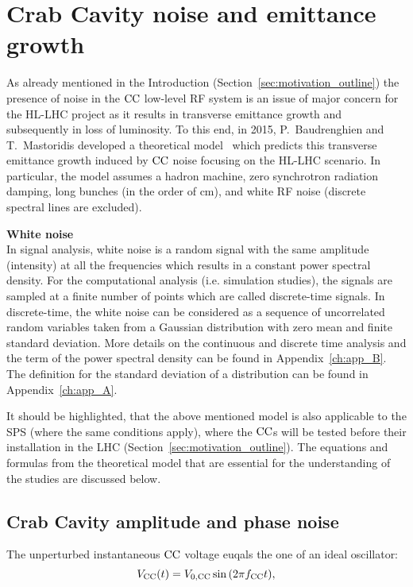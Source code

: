 \section{Crab Cavity noise and emittance growth}\label{eq:CC_noise_intro}
As already mentioned in the Introduction (Section~\ref{sec:motivation_outline}) the presence of noise in the ${\mathrm{CC}}$ low-level RF system is an issue of major concern for the HL-LHC project as it results in transverse emittance growth and subsequently in loss of luminosity. To this end, in 2015, P.~Baudrenghien and T.~Mastoridis developed a theoretical model~\cite{PhysRevSTAB.18.101001} which predicts this transverse emittance growth induced by ${\mathrm{CC}}$ noise focusing on the HL-LHC scenario. In particular, the model assumes a hadron machine, zero synchrotron radiation damping, long bunches (in the order of cm), and white RF noise (discrete spectral lines are excluded).  

\textbf{White noise}\\
In signal analysis, white noise is a random signal with the same amplitude (intensity) at all the frequencies which results in a constant power spectral density. For the computational analysis (i.e. simulation studies), the signals are sampled at a finite number of points which are called discrete-time signals. In discrete-time, the white noise can be considered as a sequence of uncorrelated random variables taken from a Gaussian distribution with zero mean and finite standard deviation. More details on the continuous and discrete time analysis and the term of the power spectral density can be found in Appendix~\ref{ch:app_B}. The definition for the standard deviation of a distribution can be found in Appendix~\ref{ch:app_A}.

It should be highlighted, that the above mentioned model is also applicable to the SPS (where the same conditions apply), where the ${\mathrm{CC}}$s will be tested before their installation in the LHC (Section~\ref{sec:motivation_outline}). %
The equations and formulas from the theoretical model that are essential for the understanding of the studies are discussed below.


\subsection{Crab Cavity amplitude and phase noise}\label{subsec:AN_PN}
The unperturbed instantaneous ${\mathrm{CC}}$ voltage euqals the one of an ideal oscillator:
\begin{equation}\label{eq:CC_voltage_t}
    V_\mathrm{CC}(t) = {V_\mathrm{0, CC}} \sin{\left ( 2 \pi {f_\mathrm{CC}}t \right )},
\end{equation}

